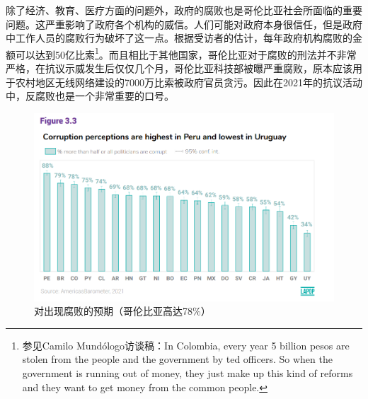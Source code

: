 \documentclass{phyasgn}\usepackage{nag}
\begin{document}
        \par 除了经济、教育、医疗方面的问题外，政府的腐败也是哥伦比亚社会所面临的重要问题。这严重影响了政府各个机构的威信。人们可能对政府本身很信任，但是政府中工作人员的腐败行为破坏了这一点。根据受访者的估计，每年政府机构腐败的金额可以达到50亿比索\footnote[11]{参见Camilo Mundólogo访谈稿：In Colombia, every year 5 billion pesos are stolen from the people and the government by ted officers. So when the government is running out of money, they just make up this kind of reforms and they want to get money from the common people.}。而且相比于其他国家，哥伦比亚对于腐败的刑法并不非常严格，在抗议示威发生后仅仅几个月，哥伦比亚科技部被曝严重腐败，原本应该用于农村地区无线网络建设的7000万比索被政府官员贪污。因此在2021年的抗议活动中，反腐败也是一个非常重要的口号。
        \begin{figure}[!h]
            	\centering
            	\includegraphics[width=.9\linewidth]{pic/3.png}
            	\caption{对出现腐败的预期（哥伦比亚高达78\%）}
            	\label{fig:3}
            	\end{figure}
\end{document}
